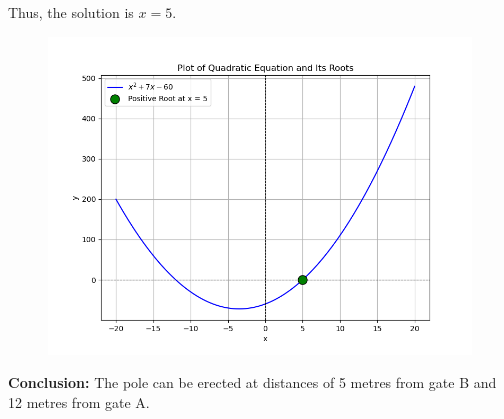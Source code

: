 \documentclass[journal]{IEEEtran}
\begin{document}
	Thus, the solution is \(x = 5\).\\
	
	\begin{figure}[h]
		\centering
		\includegraphics[width=\textwidth]{figs/fig.png}
	\end{figure}
	
	\textbf{Conclusion:}
	The pole can be erected at distances of 5 metres from gate B and 12 metres from gate A.
	
\end{document}
